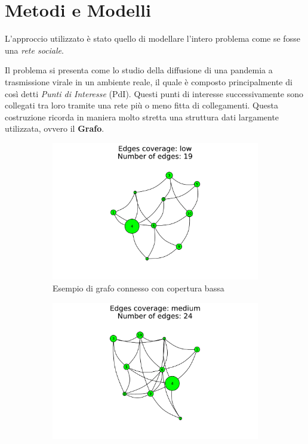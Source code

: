 \section{Metodi e Modelli}
L'approccio utilizzato è stato quello di modellare l'intero problema come 
se fosse una \emph{rete sociale}. 

Il problema si presenta come lo studio della diffusione di una pandemia a trasmissione
virale in un ambiente reale, il quale è composto principalmente di così detti 
\emph{Punti di Interesse} (PdI). Questi punti di interesse successivamente sono 
collegati tra loro tramite una rete più o meno fitta di collegamenti. Questa costruzione
ricorda in maniera molto stretta una struttura dati largamente utilizzata, ovvero il \textbf{Grafo}.

\begin{figure}[!hb]
	\centering
	\begin{subfigure}[b]{0.3\textwidth}
		\centering
		\includegraphics[width=\textwidth]{img/low.pdf}
		\caption{Esempio di grafo connesso con copertura bassa}
		\label{fig:connected_graph_example_low}
	\end{subfigure}
	\hfill
	\begin{subfigure}[b]{0.3\textwidth}
		\centering
		\includegraphics[width=\textwidth]{img/medium.pdf}

\end{subfigure}
\end{figure}
